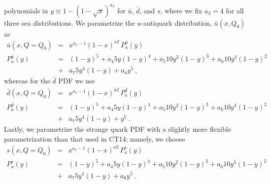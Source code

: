 polynomials in $y\! \equiv\! 1\! -\! (1\! -\! \sqrt{x})^{a_3}$ for
$\bar{u}$, $\bar{d}$, and $s$, where we fix $a_3\! =\! 4$ for
all three sea distributions.
%
We parametrize the $u$-antiquark distribution, $\bar{u}(x,Q_0)$ as
%
\begin{eqnarray}
\bar{u}(x,Q=Q_0) &=& x^{a_1-1}(1-x)^{a2}\,P^{\bar{u}}_a(y) \\
P^{\bar{u}}_a(y) &=&             (1-y)^5 + 
a_4   5 y   (1-y)^4 + 
a_5  10 y^2 (1-y)^3 + 
a_6  10 y^3 (1-y)^2   \nonumber \\
&+& a_7   5 y^4 (1-y)   + 
a_8     y^5\ , \nonumber 
\end{eqnarray}
%
whereas for the $\bar{d}$ PDF we use
%
\begin{eqnarray}
\bar{d}(x,Q=Q_0) &=& x^{a_1-1}(1-x)^{a2}\,P^{\bar{d}}_a(y) \\
P^{\bar{d}}_a(y) &=&            (1-y)^5 + 
a_4   5 y   (1-y)^4 + 
a_5  10 y^2 (1-y)^3 +
a_6  10 y^3 (1-y)^2  \nonumber \\
&+& a_7   5 y^4 (1-y)   + 
y^5\ . \nonumber
\end{eqnarray}
%
%
%                                                  
%                                                  
%                                                  
%
Lastly, we parametrize the strange quark PDF with a slightly more flexible
parametrization than that used in CT14; namely, we choose
%
\begin{eqnarray}
\label{eq:s_param}
s(x,Q=Q_0) &=& x^{a_1-1}(1-x)^{a2}\,P^s_a(y) \\
P^s_a(y) &=&            (1-y)^5 + 
a_4   5 y   (1-y)^4 + 
a_5  10 y^2 (1-y)^3 + 
a_6  10 y^3 (1-y)^2  \nonumber \\ 
&+& a_7   5 y^4 (1-y)   + 
a_8 y^5\ . \nonumber
\end{eqnarray}
